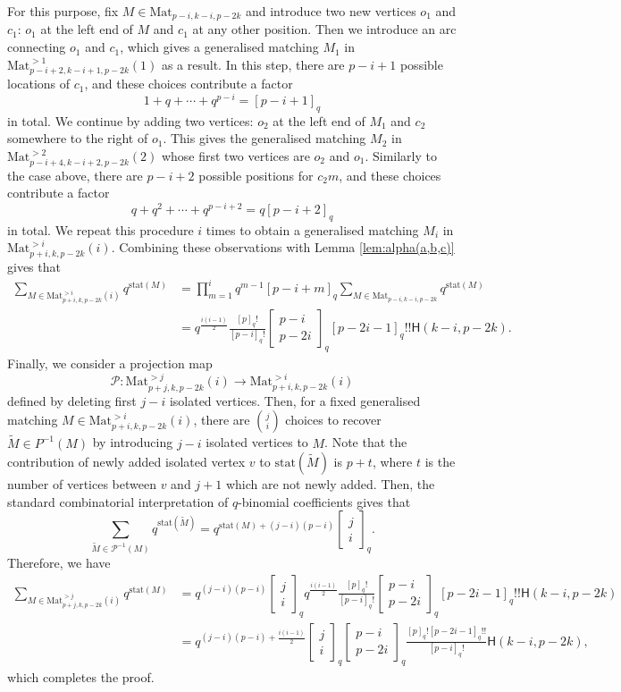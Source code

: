 \documentclass{amsart}
\newcommand{\qbinom}[2]{{\begin{bmatrix}#1\\#2\end{bmatrix}}_q}
\theoremstyle{plain}
\theoremstyle{remark}
\numberwithin{equation}{section}
\begin{document}
For this purpose, fix $M\in{\mathrm{Mat}}_{p-i,k-i,p-2k}$ and introduce two new vertices $o_1$ and $c_1$: $o_1$ at the left end of $M$ and $c_1$ at any other position. Then we introduce an arc connecting $o_1$ and $c_1$, which gives a generalised matching $M_1$ in ${\mathrm{Mat}}_{p-i+2,k-i+1,p-2k}^{>1}(1)$ as a result. In this step, there are $p-i+1$ possible locations of $c_1$, and these choices contribute a factor
\begin{equation*}
    1+q+\cdots +q^{p-i}=[p-i+1]_{q}
\end{equation*}
in total. We continue by adding two vertices: $o_2$ at the left end of $M_1$ and $c_2$ somewhere to the right of $o_1$. This gives the generalised matching $M_2$ in ${\mathrm{Mat}}_{p-i+4,k-i+2,p-2k}^{>2}(2)$ whose first two vertices are $o_2$ and $o_1$. Similarly to the case above, there are \( p - i + 2 \) possible positions for \( c_2 m \), and these choices contribute a factor 
\begin{equation*}
    q+q^2+\cdots+q^{p-i+2}=q[p-i+2]_{q}
\end{equation*}
in total. We repeat this procedure $i$ times to obtain a generalised matching $M_i$ in ${\mathrm{Mat}}_{p+i,k,p-2k}^{>i}(i)$. Combining these observations with Lemma \ref{lem:alpha(a,b,c)} gives that
\begin{align*}
    \sum_{M\in{\mathrm{Mat}}_{p+i,k,p-2k}^{>i}(i)}q^{\mathrm{stat}(M)}
    &=\prod_{m=1}^{i}q^{m-1}[p-i+m]_{q}\sum_{M\in{\mathrm{Mat}}_{p-i,k-i,p-2k}}q^{\mathrm{stat}(M)}\\
    &=q^{\frac{i(i-1)}{2}}\frac{[p]_{q}!}{[p-i]_{q}!}\qbinom{p-i}{p-2i}[p-2i-1]_{q}!!\mathsf{H}(k-i,p-2k).
\end{align*}
Finally, we consider a projection map
\begin{equation*}
    \mathcal{P}:{\mathrm{Mat}}_{p+j,k,p-2k}^{>j}(i)\rightarrow 
    {\mathrm{Mat}}_{p+i,k,p-2k}^{>i}(i)
\end{equation*}
defined by deleting first $j-i$ isolated vertices. Then, for a fixed generalised matching $M\in{\mathrm{Mat}}_{p+i,k,p-2k}^{>i}(i)$, there are $\binom{j}{i}$ choices to recover $\widetilde{M}\in P^{-1}(M)$ by introducing $j-i$ isolated vertices to $M$. Note that the contribution of newly added isolated vertex $v$ to $\mathrm{stat}(\widetilde{M})$ is $p+t$, where $t$ is the number of vertices between $v$ and $j+1$ which are not newly added. Then, the standard combinatorial interpretation of $q$-binomial coefficients gives that
\begin{equation*}
    \sum_{\tilde{M}\in\mathcal{P}^{-1}(M)}q^{\mathrm{stat}(\tilde{M})}
    =q^{\mathrm{stat}(M)+(j-i)(p-i)}\qbinom{j}{i}.
\end{equation*}
Therefore, we have
\begin{align*}
    \sum_{M\in{\mathrm{Mat}}_{p+j,k,p-2k}^{>j}(i)}q^{\mathrm{stat}(M)}
    &=q^{(j-i)(p-i)}\qbinom{j}{i}q^{\frac{i(i-1)}{2}}\frac{[p]_{q}!}{[p-i]_{q}!}\qbinom{p-i}{p-2i}[p-2i-1]_{q}!!\mathsf{H}(k-i,p-2k)\\
    &=q^{(j-i)(p-i)+\frac{i(i-1)}{2}}\qbinom{j}{i}\qbinom{p-i}{p-2i}\frac{[p]_{q}![p-2i-1]_{q}!!}{[p-i]_{q}!}\mathsf{H}(k-i,p-2k),
\end{align*}
which completes the proof.
\end{document}
